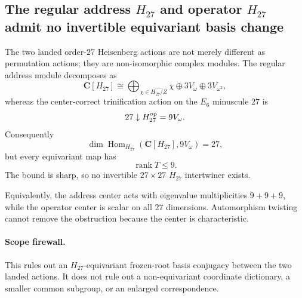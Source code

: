 \subsection*{The regular address $H_{27}$ and operator $H_{27}$ admit no invertible equivariant basis change}

The two landed order-$27$ Heisenberg actions are not merely different as
permutation actions; they are non-isomorphic complex modules.  The regular
address module decomposes as
\[
\mathbf C[H_{27}]
\cong
\bigoplus_{\chi\in\widehat{H_{27}/Z}}\chi
\oplus3V_\omega\oplus3V_{\omega^2},
\]
whereas the center-correct trinification action on the $E_6$ minuscule $27$ is
\[
27\downarrow H_{27}^{\rm op}=9V_\omega.
\]
Consequently
\[
\dim\operatorname{Hom}_{H_{27}}
\!\left(\mathbf C[H_{27}],9V_\omega\right)=27,
\]
but every equivariant map has
\[
\boxed{\operatorname{rank}T\le 9.}
\]
The bound is sharp, so no invertible $27\times27$ $H_{27}$ intertwiner exists.

Equivalently, the address center acts with eigenvalue multiplicities
$9+9+9$, while the operator center is scalar on all $27$ dimensions.
Automorphism twisting cannot remove the obstruction because the center is
characteristic.

\paragraph{Scope firewall.}
This rules out an $H_{27}$-equivariant frozen-root basis conjugacy between the
two landed actions.  It does not rule out a non-equivariant coordinate
dictionary, a smaller common subgroup, or an enlarged correspondence.
